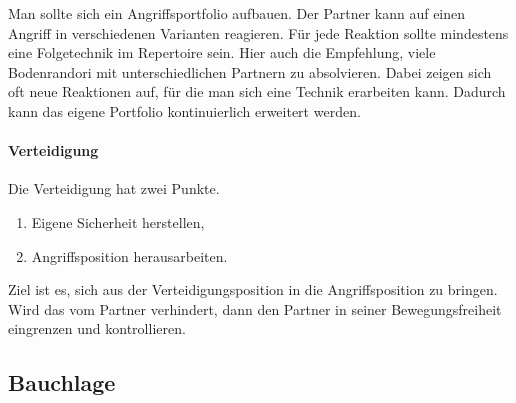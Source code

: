 \documentclass[justified, a4paper, notitlepage, captions=tableheading, nobib]{tufte-handout}
\begin{document}
Man sollte sich ein Angriffsportfolio aufbauen. Der Partner kann auf einen Angriff in verschiedenen Varianten reagieren. Für jede Reaktion sollte mindestens eine Folgetechnik im Repertoire sein. Hier auch die Empfehlung, viele Bodenrandori mit unterschiedlichen Partnern zu absolvieren. Dabei zeigen sich oft neue Reaktionen auf, für die man sich eine Technik erarbeiten kann. Dadurch kann das eigene Portfolio kontinuierlich erweitert werden. 

\paragraph{Verteidigung}
\label{sec:orge950e44}
Die Verteidigung hat zwei Punkte. 
\begin{enumerate}
\item Eigene Sicherheit herstellen,
\item Angriffsposition herausarbeiten.
\end{enumerate}
Ziel ist es, sich aus der Verteidigungsposition in die Angriffsposition zu bringen. 
Wird das vom Partner verhindert, dann den Partner in seiner Bewegungsfreiheit eingrenzen und kontrollieren.

\subsection{\label{orgffa54d6}Bauchlage }
\label{sec:org73a8d3f}
\end{document}
